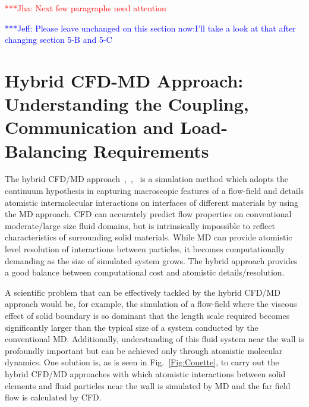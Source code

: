 \documentclass[conference,final]{IEEEtran}
\newcommand{\jhanote}[1]{ {\textcolor{red} { ***Jha: #1 }}}
\newcommand{\skonote}[1]{ {\textcolor{blue} { ***Jeff: #1 }}}
\newcommand{\jhanote}[1]{}
\newcommand{\skonote}[1]{}
\begin{document}
\jhanote{Next few paragraphs need attention}

\skonote{Please leave unchanged on this section now:I'll take a look at that after changing section 5-B and 5-C}
\section{Hybrid CFD-MD Approach: Understanding the Coupling,
  Communication and Load-Balancing Requirements}

The hybrid CFD/MD approach~\cite{Thompson},~\cite{Nie},~\cite{Yen} is
a simulation method which adopts the continuum hypothesis in capturing
macroscopic features of a flow-field and details atomistic
intermolecular interactions on interfaces of different materials by
using the MD approach. CFD can accurately predict flow properties on
conventional moderate/large size fluid domains, but is intrinsically
impossible to reflect characteristics of surrounding solid materials.
While MD can provide atomistic level resolution of interactions
between particles, it becomes computationally demanding as the size of
simulated system grows. The hybrid approach provides a good balance
between computational cost and atomistic details/resolution.


A scientific problem that can be effectively tackled by the hybrid
CFD/MD approach would be, for example, the simulation of a flow-field
where the viscous effect of solid boundary is so dominant that the
length scale required becomes significantly larger than the typical
size of a system conducted by the conventional MD. Additionally,
understanding of this fluid system near the wall is profoundly
important but can be achieved only through atomistic molecular
dynamics. One solution is, as is seen in Fig.~\ref{Fig:Couette}, to
carry out the hybrid CFD/MD approaches with which atomistic
interactions between solid elements and fluid particles near the wall
is simulated by MD and the far field flow is calculated by CFD.
\end{document}
